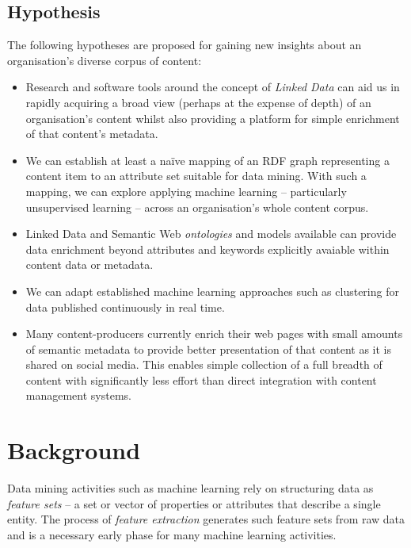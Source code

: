 \documentclass[10pt,a4paper]{report}
\begin{document}
\section{Hypothesis}

The following hypotheses are proposed for gaining new insights about an
organisation's diverse corpus of content:

\begin{itemize}

\item Research and software tools around the concept of \emph{Linked Data} can
aid us in rapidly acquiring a broad view (perhaps at the expense of depth) of an
organisation's content whilst also providing a platform for simple enrichment of
that content's metadata.

\item We can establish at least a na\"ive mapping of an RDF graph representing a
content item to an attribute set suitable for data mining. With such a mapping,
we can explore applying machine learning -- particularly unsupervised learning
-- across an organisation's whole content corpus.

\item Linked Data and Semantic Web \emph{ontologies} and models available can
provide data enrichment beyond attributes and keywords explicitly avaiable
within content data or metadata.

\item We can adapt established machine learning approaches such as clustering
for data published continuously in real time.

\item Many content-producers currently enrich their web pages with small
amounts of semantic metadata to provide better presentation of that content
as it is shared on social media. This enables simple collection of a full
breadth of content with significantly less effort than direct integration
with content management systems.

\end{itemize}

\chapter{Background}

Data mining activities such as machine learning rely on structuring data as
\emph{feature sets}\cite{bishop2006pattern} -- a set or vector of properties or
attributes that describe a single entity. The process of \emph{feature extraction}
generates such feature sets from raw data and is a necessary early phase for
many machine learning activities.
\end{document}
